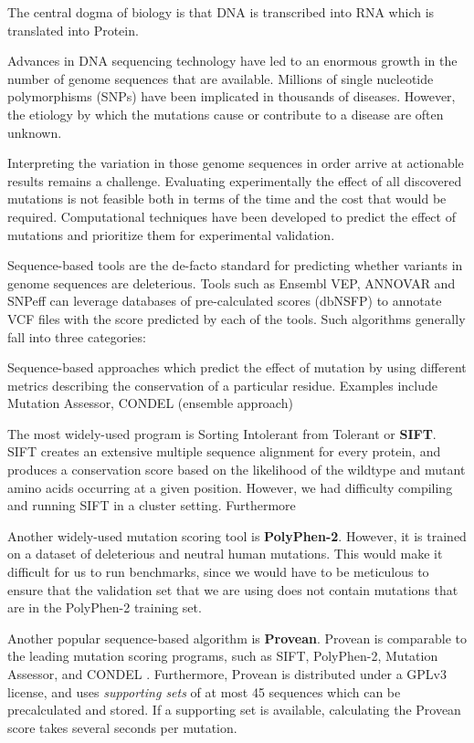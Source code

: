

The central dogma of biology is that DNA is transcribed into RNA which is translated into Protein.


Advances in DNA sequencing technology have led to an enormous growth in the number of genome sequences that are available. Millions of single nucleotide polymorphisms (SNPs) have been implicated in thousands of diseases. However, the etiology by which the mutations cause or contribute to a disease are often unknown.

Interpreting the variation in those genome sequences in order arrive at actionable results remains a challenge. Evaluating experimentally the effect of all discovered mutations is not feasible both in terms of the time and the cost that would be required. Computational techniques have been developed to predict the effect of mutations and prioritize them for experimental validation.

Sequence-based tools are the de-facto standard for predicting whether variants in genome sequences are deleterious. Tools such as Ensembl VEP, ANNOVAR and SNPeff can leverage databases of pre-calculated scores (dbNSFP) to annotate VCF files with the score predicted by each of the tools.
Such algorithms generally fall into three categories:

Sequence-based approaches which predict the effect of mutation by using different metrics describing the conservation of a particular residue. Examples include Mutation Assessor, CONDEL (ensemble approach)

The most widely-used program is Sorting Intolerant from Tolerant or \textbf{SIFT}. SIFT creates an extensive multiple sequence alignment for every protein, and produces a conservation score based on the likelihood of the wildtype and mutant amino acids occurring at a given position. However, we had difficulty compiling and running SIFT in a cluster setting. Furthermore

Another widely-used mutation scoring tool is \textbf{PolyPhen-2}. However, it is trained on a dataset of deleterious and neutral human mutations. This would make it difficult for us to run benchmarks, since we would have to be meticulous to ensure that the validation set that we are using does not contain mutations that are in the PolyPhen-2 training set.

Another popular sequence-based algorithm is \textbf{Provean}. Provean is comparable to the leading mutation scoring programs, such as SIFT, PolyPhen-2, Mutation Assessor, and CONDEL \cite{choi_predicting_2012}. Furthermore, Provean is distributed under a GPLv3 license, and uses \textit{supporting sets} of at most 45 sequences which can be precalculated and stored. If a supporting set is available, calculating the Provean score takes several seconds per mutation.


